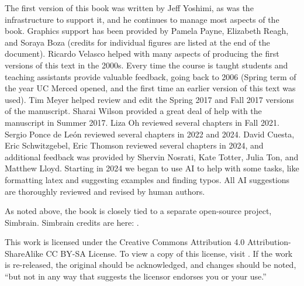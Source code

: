 The first version of this book was written by Jeff Yoshimi, as was the infrastructure to support it, and he continues to manage most aspects of the book. Graphics support has been provided by Pamela Payne, Elizabeth Reagh, and Soraya Boza (credits for individual figures are listed at the end of the document). Ricardo Velasco helped with many aspects of producing the first versions of this text in the 2000s. Every time the course is taught students and teaching assistants provide valuable feedback, going back to 2006 (Spring term of the year UC Merced opened, and the first time an earlier version of this text was used). Tim Meyer helped review and edit the Spring 2017 and Fall 2017 versions of the manuscript.  Sharai Wilson provided a great deal of help with the manuscript in Summer 2017. Liza Oh reviewed several chapters in Fall 2021. Sergio Ponce de León reviewed several chapters in 2022 and 2024. David Cuesta, Eric Schwitzgebel, Eric Thomson reviewed several chapters in 2024, and additional feedback was provided by Shervin Nosrati, Kate Totter, Julia Ton, and Matthew Lloyd. Starting in 2024 we began to use AI to help with some tasks, like formatting latex and suggesting examples and finding typos. All AI suggestions are thoroughly reviewed and revised by human authors.

As noted above, the book is closely tied to a separate open-source project, Simbrain. Simbrain credits are here: .

This work is licensed under the Creative Commons Attribution 4.0 Attribution-ShareAlike CC BY-SA License. To view a copy of this license, visit . If the work is re-released, the original should be acknowledged, and changes should be noted, ``but not in any way that suggests the licensor endorses you or your use.''

\begin{figure}[h]
\end{figure}
